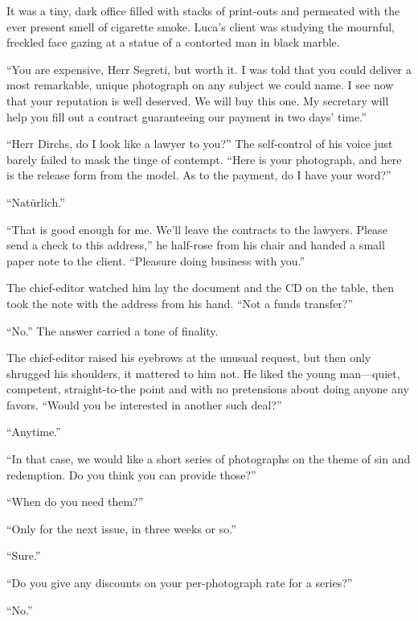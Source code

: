 \sectionline

It was a tiny, dark office filled with stacks of print-outs and permeated with the ever present smell of cigarette smoke. Luca's client was studying the mournful, freckled face gazing at a statue of a contorted man in black marble.

``You are expensive, Herr Segreti, but worth it. I was told that you could deliver a most remarkable, unique photograph on any subject we could name. I see now that your reputation is well deserved. We will buy this one. My secretary will help you fill out a contract guaranteeing our payment in two days' time.''

``Herr Dirchs, do I look like a lawyer to you?'' The self-control of his voice just barely failed to mask the tinge of contempt. ``Here is your photograph, and here is the release form from the model. As to the payment, do I have your word?''


``Natürlich.''


``That is good enough for me. We'll leave the contracts to the lawyers. Please send a check to this address,'' he half-rose from his chair and handed a small paper note to the client. ``Pleasure doing business with you.''

The chief-editor watched him lay the document and the CD on the table, then took the note with the address from his hand. ``Not a funds transfer?''

``No.'' The answer carried a tone of finality.

The chief-editor raised his eyebrows at the unusual request, but then only shrugged his shoulders, it mattered to him not. He liked the young man---quiet, competent, straight-to-the point and with no pretensions about doing anyone any favors. ``Would you be interested in another such deal?''

``Anytime.''

``In that case, we would like a short series of photographs on the theme of sin and redemption. Do you think you can provide those?''

``When do you need them?''

``Only for the next issue, in three weeks or so.''

``Sure.''

``Do you give any discounts on your per-photograph rate for a series?''

``No.''

